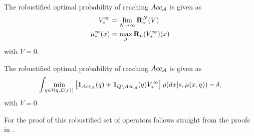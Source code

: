 \documentclass{ifacconf}
\begin{document}
The robustified optimal probability of reaching $Acc_{\mathcal{A}}$ is given as
\begin{align}
	V^\infty_\ast & =\lim_{N\rightarrow \infty}{\mathbf {R}}_\ast^N (V) \\
	{\mu}^\infty_\ast(x)  &= \max_{\mu} {\mathbf {R}}_{\mu} (V_\ast^\infty)(x) 
\end{align}
with $V=0$.


The robustified optimal probability of reaching $Acc_{\mathcal{A}}$ is given as
\begin{align}
\int\!\!\min_{\bar q \in t(q,\Labset(\bar x))}\left[\mathbf 1_{Acc_\FSA }(\bar q)+ \mathbf 1_{Q \setminus Acc_\FSA }(\bar q) V^\infty_\ast \right]%
\bar{\init} (d\bar x|s,\pol(x,q))-\delta,
\end{align}
with $V=0$.


For the proof of this robustified set of operators follows straight from the proofs in \citep{tech_report_TACAS}.
 




%
%
%
%
%
%  
%
%
%
\end{document}
